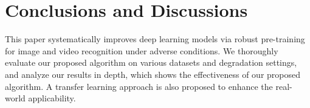 \documentclass[10pt,twocolumn,twoside]{IEEEtran} %
\begin{document}

%
%
%
%
%

\section{Conclusions and Discussions}\label{sec:conc}

This paper systematically improves deep learning models via robust pre-training for image and video recognition under adverse conditions. We thoroughly evaluate our proposed algorithm on various datasets and degradation settings, and analyze our results in depth, 
which shows the effectiveness of our proposed algorithm.
A transfer learning approach is also proposed to enhance the real-world applicability.  
\end{document}
